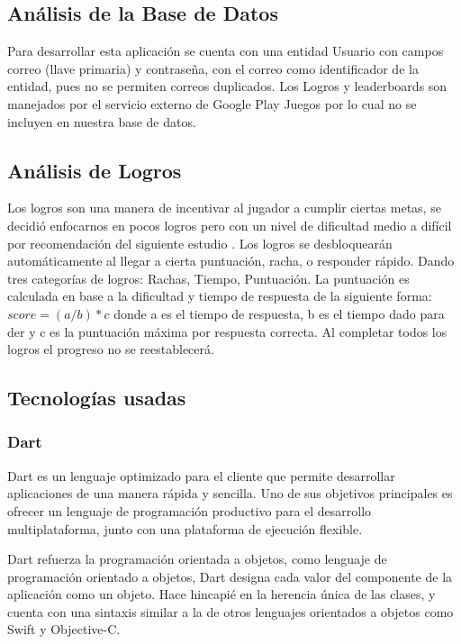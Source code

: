 \documentclass{article}
\begin{document}
\subsection{Análisis de la Base de Datos}%
Para desarrollar esta aplicación se cuenta con una entidad Usuario con campos correo (llave primaria) y contraseña, con el correo como identificador de la entidad, pues no se permiten correos duplicados. Los Logros y leaderboards son manejados por el servicio externo de Google Play Juegos por lo cual no se incluyen en nuestra base de datos.

\subsection{Análisis de Logros}
Los logros son una manera de incentivar al jugador a cumplir ciertas metas, se decidió enfocarnos en pocos logros pero con un nivel de dificultad medio a difícil por recomendación del siguiente estudio \cite{groening2019achievement}.
Los logros se desbloquearán automáticamente al llegar a cierta puntuación, racha, o  responder rápido. Dando tres categorías de logros: Rachas, Tiempo, Puntuación. La puntuación es calculada en base a la dificultad y tiempo de respuesta de la siguiente forma: \(score = (a/b ) * c\) donde a es el tiempo de respuesta, b es el tiempo dado para 
der y c es la puntuación máxima por respuesta correcta.   Al completar todos los logros el progreso no se reestablecerá. 


\subsection{Tecnologías usadas}
\subsubsection{Dart}
Dart es un lenguaje optimizado para el cliente que permite desarrollar 
aplicaciones de una manera rápida y sencilla. Uno de sus objetivos principales es 
ofrecer un lenguaje de programación productivo para el desarrollo multiplataforma, 
junto con una plataforma de ejecución flexible.

Dart refuerza la programación orientada a objetos, como lenguaje de programación 
orientado a objetos, Dart designa cada valor del componente de la aplicación como 
un objeto. Hace hincapié en la herencia única de las clases, y cuenta con una sintaxis 
similar a la de otros lenguajes orientados a objetos como Swift y Objective-C.
\end{document}
